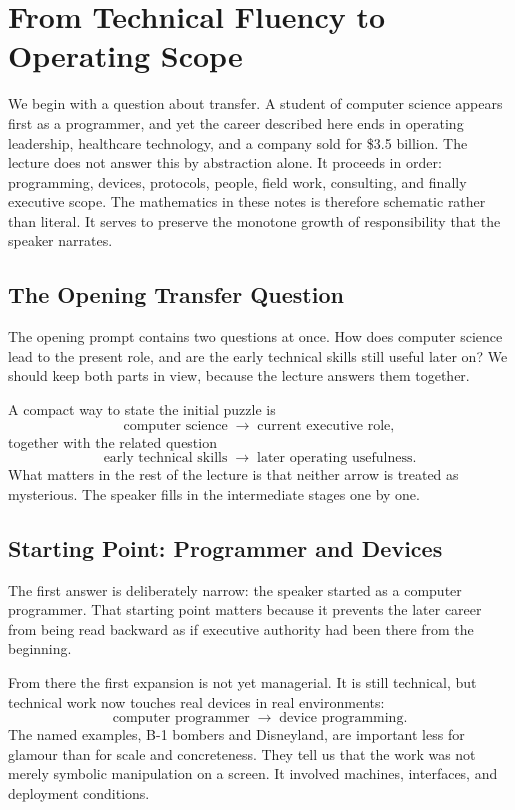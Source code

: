 \chapter{From Technical Fluency to Operating Scope}

We begin with a question about transfer. A student of computer science appears first as a programmer, and yet the career described here ends in operating leadership, healthcare technology, and a company sold for \$3.5 billion. The lecture does not answer this by abstraction alone. It proceeds in order: programming, devices, protocols, people, field work, consulting, and finally executive scope. The mathematics in these notes is therefore schematic rather than literal. It serves to preserve the monotone growth of responsibility that the speaker narrates.

\section{The Opening Transfer Question}

The opening prompt contains two questions at once. How does computer science lead to the present role, and are the early technical skills still useful later on? We should keep both parts in view, because the lecture answers them together.

A compact way to state the initial puzzle is
\begin{equation}
\text{computer science} \;\to\; \text{current executive role},
\end{equation}
together with the related question
\begin{equation}
\text{early technical skills} \;\to\; \text{later operating usefulness}.
\end{equation}
What matters in the rest of the lecture is that neither arrow is treated as mysterious. The speaker fills in the intermediate stages one by one.

\section{Starting Point: Programmer and Devices}

The first answer is deliberately narrow: the speaker started as a computer programmer. That starting point matters because it prevents the later career from being read backward as if executive authority had been there from the beginning.

From there the first expansion is not yet managerial. It is still technical, but technical work now touches real devices in real environments:
\begin{equation}
\text{computer programmer} \;\to\; \text{device programming}.
\end{equation}
The named examples, B-1 bombers and Disneyland, are important less for glamour than for scale and concreteness. They tell us that the work was not merely symbolic manipulation on a screen. It involved machines, interfaces, and deployment conditions.

